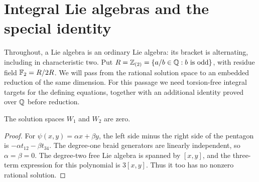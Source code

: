 \section{Integral Lie algebras and the special identity}
\label{sec:algebra}

Throughout, a Lie algebra is an ordinary Lie algebra: its bracket is
alternating, including in characteristic two.  Put
\(R=\mathbb Z_{(2)}=\{a/b\in\mathbb Q:b\text{ is odd}\}\), with residue field
\({\mathbb F_2}=R/2R\).  We will pass from the rational solution space to an
embedded reduction of the same dimension.  For this passage we need
torsion-free integral targets for the defining equations, together with
an additional identity proved over \(\mathbb Q\) before reduction.

\begin{lemma}\label{lem:low-weights}
The solution spaces \(W_1\) and \(W_2\) are zero.
\end{lemma}
\begin{proof}
For \(\psi(x,y)=\alpha x+\beta y\), the left side minus the right side of
the pentagon is \(-\alpha t_{12}-\beta t_{34}\).  The degree-one braid
generators are linearly independent, so \(\alpha=\beta=0\).
The degree-two free Lie algebra is spanned by \([x,y]\), and the
three-term expression for this polynomial is \(3[x,y]\).  Thus it too
has no nonzero rational solution.
\end{proof}

